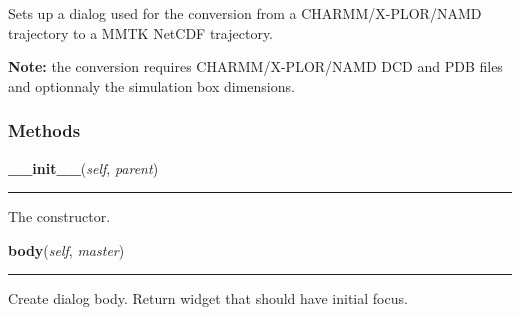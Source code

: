 Sets up a dialog used for the conversion from a CHARMM/X-PLOR/NAMD 
trajectory to a MMTK NetCDF trajectory.

\textbf{Note:} the conversion requires CHARMM/X-PLOR/NAMD DCD and PDB files and optionnaly
the simulation box dimensions.





  \subsubsection{Methods}

    \label{nMOLDYN:GUI:TrajectoryConversionDialog:NAMDConverterDialog:__init__}

    \vspace{0.5ex}

\hspace{.8\funcindent}\begin{boxedminipage}{\funcwidth}

    \raggedright \textbf{\_\_init\_\_}(\textit{self}, \textit{parent})

    \vspace{-1.5ex}

    \rule{\textwidth}{0.5\fboxrule}
\setlength{\parskip}{2ex}
    The constructor.

\setlength{\parskip}{1ex}
    \end{boxedminipage}

    \label{nMOLDYN:GUI:TrajectoryConversionDialog:NAMDConverterDialog:body}

    \vspace{0.5ex}

\hspace{.8\funcindent}\begin{boxedminipage}{\funcwidth}

    \raggedright \textbf{body}(\textit{self}, \textit{master})

    \vspace{-1.5ex}

    \rule{\textwidth}{0.5\fboxrule}
\setlength{\parskip}{2ex}
    Create dialog body. Return widget that should have initial focus.

\setlength{\parskip}{1ex}
    \end{boxedminipage}

